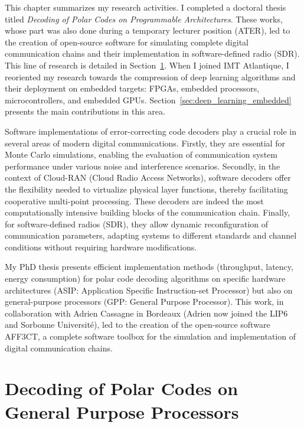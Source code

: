 \documentclass[11pt]{report}
\begin{document}
\nocite{lagrassa:hal-05525884,morlier:hal-05097338,lymanson:hal-04576139,renault:hal-05097386,morlier:hal-05497988,tessier:hal-03695958,tessier:hal-03706472,grativol:emse-04217775,cassagne:hal-01965633}
This chapter summarizes my research activities. I completed a doctoral thesis titled \textit{Decoding of Polar Codes on Programmable Architectures}. These works, whose part was also done during a temporary lecturer position (ATER), led to the creation of open-source software for simulating complete digital communication chains and their implementation in software-defined radio (SDR). This line of research is detailed in Section~\ref{sec:decoding_polar_codes_gpp}.
When I joined IMT Atlantique, I reoriented my research towards the compression of deep learning algorithms and their deployment on embedded targets: FPGAs, embedded processors, microcontrollers, and embedded GPUs. Section~\ref{sec:deep_learning_embedded} presents the main contributions in this area.


Software implementations of error-correcting code decoders play a crucial role in several areas of modern digital communications. Firstly, they are essential for Monte Carlo simulations, enabling the evaluation of communication system performance under various noise and interference scenarios. Secondly, in the context of Cloud-RAN (Cloud Radio Access Networks), software decoders offer the flexibility needed to virtualize physical layer functions, thereby facilitating cooperative multi-point processing. These decoders are indeed the most computationally intensive building blocks of the communication chain. Finally, for software-defined radios (SDR), they allow dynamic reconfiguration of communication parameters, adapting systems to different standards and channel conditions without requiring hardware modifications.

My PhD thesis presents efficient implementation methods (throughput, latency, energy consumption) for polar code decoding algorithms on specific hardware architectures (ASIP: Application Specific Instruction-set Processor) but also on general-purpose processors (GPP: General Purpose Processor). This work, in collaboration with Adrien Cassagne in Bordeaux (Adrien now joined the LIP6 and Sorbonne Université), led to the creation of the open-source software AFF3CT, a complete software toolbox for the simulation and implementation of digital communication chains.

\newpage
\section{Decoding of Polar Codes on General Purpose Processors}
\label{sec:decoding_polar_codes_gpp}
\end{document}
